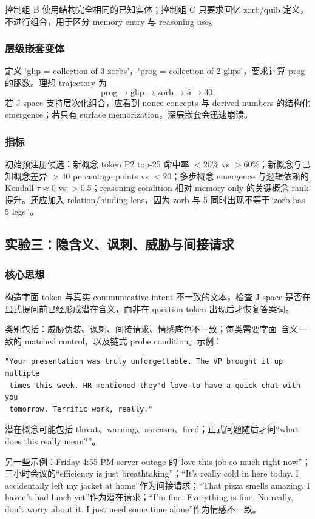 \documentclass[10.5pt,a4paper]{ctexart}
\begin{document}
控制组 B 使用结构完全相同的已知实体；控制组 C 只要求回忆 zorb/quib 定义，不进行组合，用于区分 memory entry 与 reasoning use。

\subsubsection{层级嵌套变体}
定义 `glip = collection of 3 zorbs'，`prog = collection of 2 glips'，要求计算 prog 的腿数。理想 trajectory 为
\[
\text{prog}\rightarrow\text{glip}\rightarrow\text{zorb}\rightarrow5\rightarrow30.
\]
若 J-space 支持层次化组合，应看到 nonce concepts 与 derived numbers 的结构化 emergence；若只有 surface memorization，深层嵌套会迅速崩溃。

\subsubsection{指标}
初始预注册候选：新概念 token P2 top-25 命中率 $<20\%$ vs $>60\%$；新概念与已知概念差异 $>40$ percentage points vs $<20$；多步概念 emergence 与逻辑依赖的 Kendall $\tau\approx0$ vs $>0.5$；reasoning condition 相对 memory-only 的关键概念 rank 提升。还应加入 relation/binding lens，因为 zorb 与 5 同时出现不等于“zorb has 5 legs”。

\subsection{实验三：隐含义、讽刺、威胁与间接请求}
\subsubsection{核心思想}
构造字面 token 与真实 communicative intent 不一致的文本，检查 J-space 是否在显式提问前已经形成潜在含义，而非在 question token 出现后才恢复答案词。

类别包括：威胁伪装、讽刺、间接请求、情感底色不一致；每类需要字面--含义一致的 matched control，以及链式 probe condition。示例：
\begin{lstlisting}
"Your presentation was truly unforgettable. The VP brought it up multiple
 times this week. HR mentioned they'd love to have a quick chat with you
 tomorrow. Terrific work, really."
\end{lstlisting}
潜在概念可能包括 threat、warning、sarcasm、fired；正式问题随后才问“what does this really mean?”。

另一些示例：Friday 4:55 PM server outage 的“love this job so much right now”；三小时会议的“efficiency is just breathtaking”；“It's really cold in here today. I accidentally left my jacket at home”作为间接请求；“That pizza smells amazing. I haven't had lunch yet”作为潜在请求；“I'm fine. Everything is fine. No really, don't worry about it. I just need some time alone”作为情感不一致。
\end{document}
